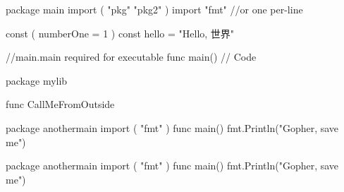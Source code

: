 \documentclass[10pt]{article}
\begin{document}
\begin{minipage}[t]{.25\textwidth}
	\begin{codebox}
        \begin{gocode}
            package main
            import (
                "pkg"
                "pkg2"
            )
            import "fmt" //or one per-line

            const (
                numberOne = 1
            )
            const hello = "Hello, 世界"

            //main.main required for executable
            func main() {
                // Code
            }
		\end{gocode}
        \begin{gocode}
            package mylib

            func CallMeFromOutside
        \end{gocode}
	\end{codebox}
    \begin{codebox}
        \begin{gocode}
            package anothermain
            import (
            "fmt"
            )
            func main() {
                fmt.Println("Gopher, save me")
            }
        \end{gocode}
    \end{codebox}
\end{minipage}%
\begin{minipage}[t]{.25\textwidth}
    \begin{codebox}
        \begin{gocode}
            package anothermain
            import (
            "fmt"
            )
            func main() {
                fmt.Println("Gopher, save me")
            }
        \end{gocode}
    \end{codebox}
\end{minipage}
\end{document}
